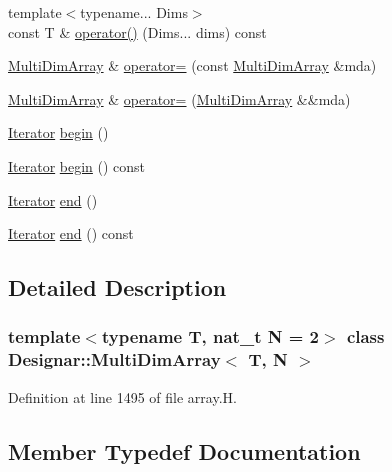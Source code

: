 \begin{DoxyCompactItemize}
\item 
{\footnotesize template$<$typename... Dims$>$ }\\const T \& \hyperlink{class_designar_1_1_multi_dim_array_a1edce0b31104f2b50bd8f8047e373b78}{operator()} (Dims... dims) const
\item 
\hyperlink{class_designar_1_1_multi_dim_array}{Multi\+Dim\+Array} \& \hyperlink{class_designar_1_1_multi_dim_array_a4f191233c720bc670a181682b0452347}{operator=} (const \hyperlink{class_designar_1_1_multi_dim_array}{Multi\+Dim\+Array} \&mda)
\item 
\hyperlink{class_designar_1_1_multi_dim_array}{Multi\+Dim\+Array} \& \hyperlink{class_designar_1_1_multi_dim_array_a45e425f7a1795d97822d8fafe5c02244}{operator=} (\hyperlink{class_designar_1_1_multi_dim_array}{Multi\+Dim\+Array} \&\&mda)
\item 
\hyperlink{class_designar_1_1_multi_dim_array_1_1_iterator}{Iterator} \hyperlink{class_designar_1_1_multi_dim_array_adaed0d8dcdb5500e751f27418e914c4d}{begin} ()
\item 
\hyperlink{class_designar_1_1_multi_dim_array_1_1_iterator}{Iterator} \hyperlink{class_designar_1_1_multi_dim_array_ad3760c3ce200ee63585ab7c7841b433d}{begin} () const
\item 
\hyperlink{class_designar_1_1_multi_dim_array_1_1_iterator}{Iterator} \hyperlink{class_designar_1_1_multi_dim_array_a6fc4ca23162a6b285f2a6fd698232459}{end} ()
\item 
\hyperlink{class_designar_1_1_multi_dim_array_1_1_iterator}{Iterator} \hyperlink{class_designar_1_1_multi_dim_array_a83200332e5914f2485d64cedb87b9470}{end} () const
\end{DoxyCompactItemize}


\subsection{Detailed Description}
\subsubsection*{template$<$typename T, nat\+\_\+t N = 2$>$\newline
class Designar\+::\+Multi\+Dim\+Array$<$ T, N $>$}



Definition at line 1495 of file array.\+H.



\subsection{Member Typedef Documentation}
\mbox{\label{class_designar_1_1_multi_dim_array_a23b3bec3a6a803d8ef7becceb592d6c0}} 
